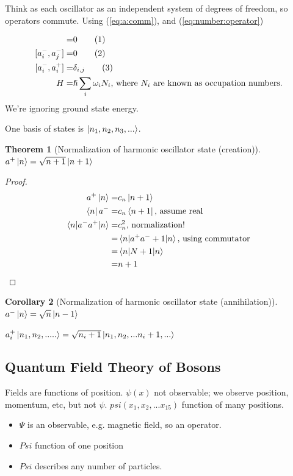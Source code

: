 \documentclass[]{article}
\newcommand\numberthis{\addtocounter{equation}{1}\tag{\theequation}}
\newtheorem{thm}{Theorem}
\newtheorem{cor}[thm]{Corollary}
\begin{document}
Think as each oscillator  as an independent system of degrees of freedom, so operators commute. Using  (\ref{eq:a:comm}), and (\ref{eq:number:operator})

\begin{align*}
[a^+_i,a^+_j] =& 0 \numberthis \label{eq:a:comm_i_plus}\\
[a^-_i,a^-_j] =& 0 \numberthis \label{eq:a:comm_i_minus}\\
[a^-_i,a^+_i] =& \delta_{i,j} \numberthis \label{eq:a:comm_i}\\
H =& \hslash \sum_{i}  \omega_i N_i\text{, where $N_i$ are known as occupation numbers.}
\end{align*}
We're ignoring ground state energy.

One basis of states is $\ket{n_1,n_2,n_3,...}$.

\begin{thm}[Normalization of harmonic oscillator state (creation)]\label{thm:norm:harmonic}
	$a^+\ket{n}=\sqrt{n+1}\ket{n+1}$
\end{thm} 

\begin{proof}
	\begin{align*}
	a^+\ket{n}=&c_n\ket{n+1}\\
	\bra{n}a^-=&c_n\bra{n+1}\text{, assume real}\\
	\braket{n|a^-a^+|n}=&c_n^2\text{, normalization!}\\
	=& \braket{n|a^+a^-+1|n}\text{, using commutator}\\
	=& \braket{n|N+1|n}\\
	=&n+1
	\end{align*}
\end{proof}

\begin{cor}[Normalization of harmonic oscillator state (annihilation)]
	$a^-\ket{n}=\sqrt{n}\ket{n-1}$
\end{cor}


$a_i^+\ket{n_1,n_2,.....}=\sqrt{n_i+1}\ket{n_1,n_2,...n_i+1,...}$

\subsection{Quantum Field Theory of Bosons}

Fields are functions of position. $\psi(x)$ not observable; we observe position, momentum, etc, but not $\psi$. $psi(x_1,x_2,...x_15)$ function of many positions.

\begin{itemize}
	\item $\Psi$ is an observable, e.g. magnetic field, so an operator.
	\item $Psi$ function of one position
	\item $Psi$ describes any number of particles.
\end{itemize}
\end{document}
